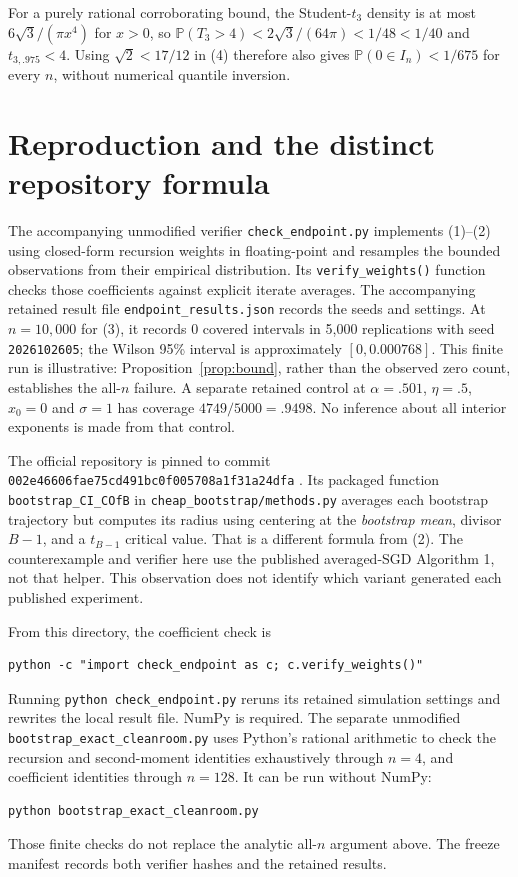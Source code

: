 \documentclass[11pt]{article}
\newcommand{\Pp}{\mathbb P}
\begin{document}
For a purely rational corroborating bound, the Student-$t_3$ density
is at most $6\sqrt3/(\pi x^4)$ for $x>0$, so
$\Pp(T_3>4)<2\sqrt3/(64\pi)<1/48<1/40$ and $t_{3,.975}<4$.
Using $\sqrt2<17/12$ in (4) therefore also gives
$\Pp(0\in I_n)<1/675$ for every $n$, without numerical quantile inversion.

\section{Reproduction and the distinct repository formula}

The accompanying unmodified verifier \texttt{check\_endpoint.py}
implements (1)--(2) using closed-form recursion weights in floating-point and resamples
the bounded observations from their empirical distribution. Its
\texttt{verify\_weights()} function checks those coefficients against
explicit iterate averages. The accompanying retained result file
\texttt{endpoint\_results.json} records the seeds and settings.
At $n=10{,}000$ for (3), it records 0 covered intervals in 5,000
replications with seed \texttt{2026102605}; the Wilson 95\% interval
is approximately $[0,0.000768]$. This finite run is illustrative:
Proposition~\ref{prop:bound}, rather than the observed zero count,
establishes the all-$n$ failure. A separate retained control at
$\alpha=.501$, $\eta=.5$, $x_0=0$ and $\sigma=1$ has coverage
$4749/5000=.9498$. No inference about all interior exponents is made
from that control.

The official repository is pinned to commit
\texttt{002e46606fae75cd491bc0f005708a1f31a24dfa} \cite{code}.
Its packaged function \texttt{bootstrap\_CI\_COfB} in
\texttt{cheap\_bootstrap/methods.py} averages each bootstrap trajectory
but computes its radius using centering at the \emph{bootstrap mean},
divisor $B-1$, and a $t_{B-1}$ critical value. That is a different formula
from (2). The counterexample and verifier here use the published
averaged-SGD Algorithm 1, not that helper. This observation does not
identify which variant generated each published experiment.

From this directory, the coefficient check is
\begin{verbatim}
python -c "import check_endpoint as c; c.verify_weights()"
\end{verbatim}
Running \texttt{python check\_endpoint.py} reruns its retained simulation
settings and rewrites the local result file. NumPy is required.
The separate unmodified \texttt{bootstrap\_exact\_cleanroom.py} uses
Python's rational arithmetic to check the recursion and second-moment
identities exhaustively through $n=4$, and coefficient identities through
$n=128$. It can be run without NumPy:
\begin{verbatim}
python bootstrap_exact_cleanroom.py
\end{verbatim}
Those finite checks do not replace the analytic all-$n$ argument above.
The freeze manifest records both verifier hashes and the retained results.
\end{document}
